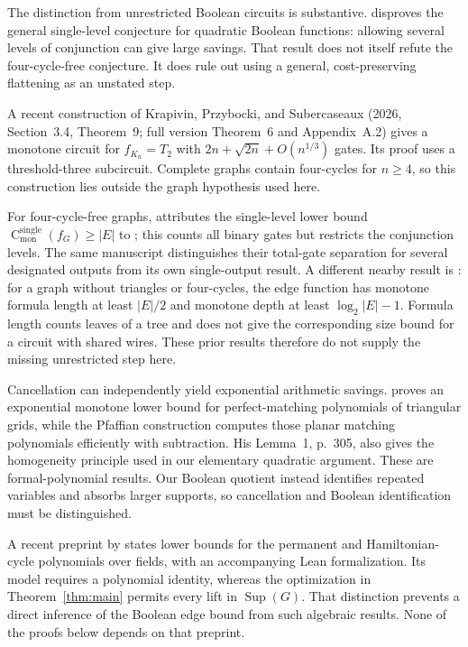\documentclass[11pt]{article}
\newcommand{\Sup}{\operatorname{Sup}}
\newcommand{\cmon}{\operatorname{C}_{\mathrm{mon}}}
\theoremstyle{definition}
\theoremstyle{remark}
\begin{document}
The distinction from unrestricted Boolean circuits is substantive. \citet[Theorem~2.1, p.~4 of the author manuscript]{JuknaSingle} disproves the general single-level conjecture for quadratic Boolean functions: allowing several levels of conjunction can give large savings. That result does not itself refute the four-cycle-free conjecture. It does rule out using a general, cost-preserving flattening as an unstated step.

A recent construction of Krapivin, Przybocki, and Subercaseaux (2026, Section~3.4, Theorem~9; full version Theorem~6 and Appendix~A.2) gives a monotone circuit for $f_{K_n}=T_2$ with $2n+\sqrt{2n}+O(n^{1/3})$ gates. Its proof uses a threshold-three subcircuit. Complete graphs contain four-cycles for $n\ge4$, so this construction lies outside the graph hypothesis used here.

For four-cycle-free graphs, \citet[Section~3, p.~11 of the author manuscript]{JuknaSingle} attributes the single-level lower bound $\cmon^{\mathrm{single}}(f_G)\ge |E|$ to \citet{AM}; this counts all binary gates but restricts the conjunction levels. The same manuscript distinguishes their total-gate separation for several designated outputs from its own single-output result. A different nearby result is \citet[Theorem~7.3, p.~18]{JuknaGraphs}: for a graph without triangles or four-cycles, the edge function has monotone formula length at least $|E|/2$ and monotone depth at least $\log_2|E|-1$. Formula length counts leaves of a tree and does not give the corresponding size bound for a circuit with shared wires. These prior results therefore do not supply the missing unrestricted step here.

Cancellation can independently yield exponential arithmetic savings. \citet[Theorem~1, p.~307]{Valiant} proves an exponential monotone lower bound for perfect-matching polynomials of triangular grids, while the Pfaffian construction computes those planar matching polynomials efficiently with subtraction. His Lemma~1, p.~305, also gives the homogeneity principle used in our elementary quadratic argument. These are formal-polynomial results. Our Boolean quotient instead identifies repeated variables and absorbs larger supports, so cancellation and Boolean identification must be distinguished.

A recent preprint by \citet[Theorem~1.1 and Section~1.3]{Anthropic} states lower bounds for the permanent and Hamiltonian-cycle polynomials over fields, with an accompanying Lean formalization. Its model requires a polynomial identity, whereas the optimization in Theorem~\ref{thm:main} permits every lift in $\Sup(G)$. That distinction prevents a direct inference of the Boolean edge bound from such algebraic results. None of the proofs below depends on that preprint.
\end{document}
